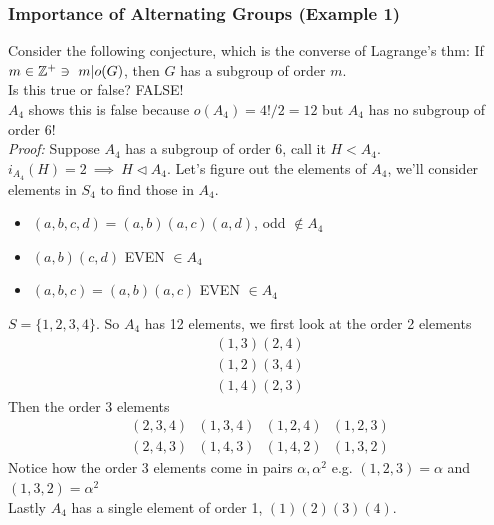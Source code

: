 \subsubsection{Importance of Alternating Groups (Example 1)}
Consider the following conjecture, which is the converse of Lagrange's thm: If
$m\in {\mathbb{Z}}^+ \ni \ m | o(G)$, then $G$ has a subgroup of order $m$.  \steezybreak \\
Is this true or false? FALSE!\\
$A_4$ shows this is false because $o(A_4) = 4!/2 = 12$ but $A_4$ has no subgroup of order 6!\\
\noindent \textit{Proof:} Suppose $A_4$ has a subgroup of order 6, call it $H<A_4$.\\
$i_{A_4}(H)=2 \ \implies \ H\triangleleft A_4$. Let's figure out the elements of $A_4$, we'll
consider elements in $S_4$ to find those in $A_4$.
\begin{itemize}
    \item {} $(a,b,c,d)=(a,b)(a,c)(a,d)$, odd $\not\in A_4$
    \item {} $(a,b)(c,d)$  EVEN $\in A_4$
    \item {} $(a,b,c) = (a,b)(a,c)$ EVEN $\in A_4$
\end{itemize}
$S=\{1,2,3,4\}$. So $A_4$ has 12 elements, we first look at the order 2 elements
\begin{align}
    (1,3)(2,4) \nonumber \\
    (1,2)(3,4) \nonumber \\
    (1,4)(2,3) \nonumber
\end{align}
Then the order 3 elements
\begin{align}
    (2,3,4) \ \ \ (1,3,4) \ \ \ (1,2,4) \ \ \ (1,2,3)\nonumber \\
    (2,4,3) \ \ \ (1,4,3) \ \ \ (1,4,2) \ \ \ (1,3,2)\nonumber
\end{align}
Notice how the order 3 elements come in pairs $\alpha, \alpha^2$ e.g. $(1,2,3)= \alpha$ and
$(1,3,2) = \alpha^2$ \\
Lastly $A_4$ has a single element of order 1, $(1)(2)(3)(4)$. \steezybreak

